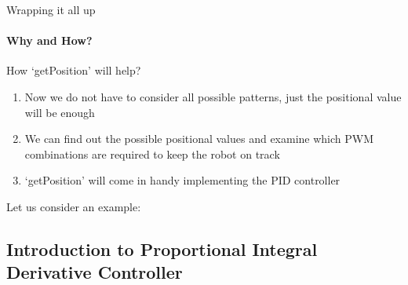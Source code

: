 \documentclass{beamer}
\begin{document}
  
  \begin{frame}[allowframebreaks]{Wrapping it all up}
  \framesubtitle{Why and How?}
  
  \begin{alertblock}{How `getPosition' will help?}
  
  	\begin{enumerate}
		
		\item{Now we do not have to consider all possible patterns, just the positional value will be enough}
		
		\item{We can find out the possible positional values and examine which PWM combinations are required to keep the robot on track}
		
		
		\item{`getPosition' will come in handy implementing the PID controller}
		  	
  	
  	\end{enumerate}
  	
  	\end{alertblock}
  	
  	
  	\begin{alertblock}
  	
  	Let us consider an example:
  	
  		\updatedDD
  	
  	\end{alertblock}
  
  \end{frame}
  
  
  \subsection{Introduction to Proportional Integral Derivative Controller}
  
\end{document}
